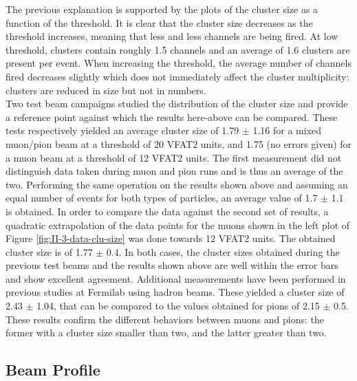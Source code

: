       The previous explanation is supported by the plots of the cluster size as a function of the threshold. It is clear that the cluster size decreases as the threshold increases, meaning that less and less channels are being fired. At low threshold, clusters contain roughly 1.5 channels and an average of 1.6 clusters are present per event. When increasing the threshold, the average number of channels fired decreases slightly which does not immediately affect the cluster multiplicity: clusters are reduced in size but not in numbers. \\

      Two test beam campaigns \cite{Abbaneo:1401079, Abbaneo:1494965} studied the distribution of the cluster size and provide a reference point against which the results here-above can be compared. These tests respectively yielded an average cluster size of 1.79 $\pm$ 1.16 for a mixed muon/pion beam at a threshold of 20 VFAT2 units, and 1.75 (no errors given) for a muon beam at a threshold of 12 VFAT2 units. The first measurement did not distinguish data taken during muon and pion runs and is thus an average of the two. Performing the same operation on the results shown above and assuming an equal number of events for both types of particles, an average value of 1.7 $\pm$ 1.1 is obtained. In order to compare the data against the second set of results, a quadratic extrapolation of the data points for the muons shown in the left plot of Figure \ref{fig:II-3-data-clu-size} was done towards 12 VFAT2 units. The obtained cluster size is of 1.77 $\pm$ 0.4. In both cases, the cluster sizes obtained during the previous test beams and the results shown above are well within the error bars and show excellent agreement. Additional measurements have been performed in previous studies \cite{Abbaneo:1973272} at Fermilab using hadron beams. These yielded a cluster size of 2.43 $\pm$ 1.04, that can be compared to the values obtained for pions of 2.15 $\pm$ 0.5. \\

      These results confirm the different behaviors between muons and pions: the former with a cluster size smaller than two, and the latter greater than two.


    \subsection{Beam Profile}

